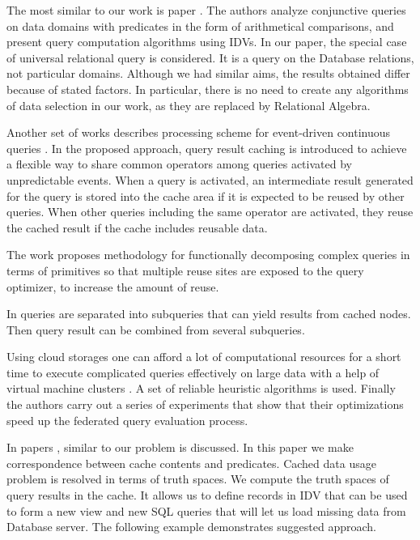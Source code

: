 \documentclass{article}
\begin{document}
The most similar to our work is paper \cite{Afrati06}. The authors analyze
conjunctive queries on data domains with predicates in the form of arithmetical
comparisons, and present query computation algorithms using IDVs. In our paper,
the special case of universal relational query is considered. It is a query on
the Database relations, not particular domains. Although we had similar aims,
the results obtained differ because of stated factors. In particular, there is
no need to create any algorithms of data selection in our work, as they are
replaced by Relational Algebra.

Another set of works describes processing scheme for event-driven continuous queries \cite{wata, yates}. In the proposed approach, query result caching is introduced to achieve a flexible way to share common operators among queries activated by unpredictable events. When a query is activated, an intermediate result generated for the query is stored into the cache area if it is expected to be reused by other queries. When other queries including the same operator are activated, they reuse the cached result if the cache includes reusable data.

The work \cite{andrade} proposes methodology for functionally decomposing complex queries in terms of primitives so that multiple reuse sites are exposed to the query optimizer, to increase the amount of reuse.

In \cite{mershad, abbani} queries are separated into subqueries that can yield results from cached nodes. Then query result can be combined from several subqueries.

Using cloud storages one can afford a lot of computational resources for a short time to execute complicated queries effectively on large data with a help of virtual machine clusters \cite{doker, beran, meij, aranda}. A set of reliable heuristic algorithms is used. Finally the authors carry out a series of experiments that show that their optimizations speed up the federated query evaluation process.

In papers \cite{Keller96}, \cite{shim} similar to our problem is discussed. In this paper we
make correspondence between cache contents and predicates. Cached data usage
problem is resolved in terms of truth spaces. We compute the truth spaces of
query results in the cache. It allows us to define records in IDV that can be
used to form a new view and new SQL queries that will let us load missing data
from Database server. The following example demonstrates suggested approach.
\end{document}
